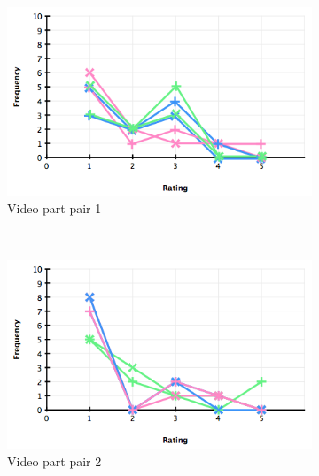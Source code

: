 \begin{figure}
  \centering
  \begin{subfigure}[b]{.32\textwidth}
    \centering
      \includegraphics[width=\textwidth]{img/evaluation/hist_video1}
    \caption{Video part pair 1}
    \label{fig:evalVideo1}
  \end{subfigure}%
  ~
  \begin{subfigure}[b]{.32\textwidth}
    \centering
      \includegraphics[width=\textwidth]{img/evaluation/hist_video2}
    \caption{Video part pair 2}
    \label{fig:evalVideo2}
  \end{subfigure}
  ~
  \begin{subfigure}[b]{.32\textwidth}
    \centering

\end{subfigure}
\end{figure}
